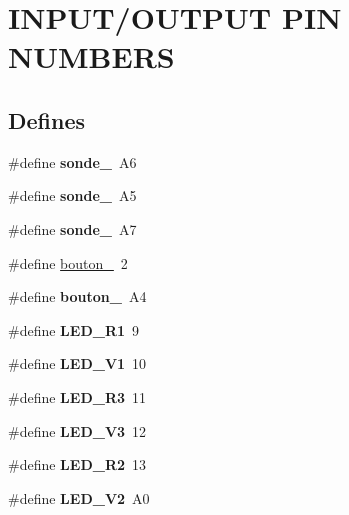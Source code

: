 \hypertarget{group__group2}{
\section{INPUT/OUTPUT PIN NUMBERS}
\label{group__group2}
}
\subsection*{Defines}
\begin{DoxyCompactItemize}
\item 
\hypertarget{group__group2_gac2d01ab1a9474f9807f8ab0c39d6f655}{
\#define {\bfseries sonde\_}~A6}
\label{group__group2_gac2d01ab1a9474f9807f8ab0c39d6f655}

\item 
\hypertarget{group__group2_ga30be1cb09f4c7ea1a84c31cbb105019b}{
\#define {\bfseries sonde\_}~A5}
\label{group__group2_ga30be1cb09f4c7ea1a84c31cbb105019b}

\item 
\hypertarget{group__group2_ga3a6c253bb983ed21757b349061df0577}{
\#define {\bfseries sonde\_}~A7}
\label{group__group2_ga3a6c253bb983ed21757b349061df0577}

\item 
\#define \hyperlink{group__group2_ga8374105c04a302f629cb815b9ecce9d0}{bouton\_}~2
\item 
\hypertarget{group__group2_ga04816731d674fc59c05fabe6ed46490c}{
\#define {\bfseries bouton\_}~A4}
\label{group__group2_ga04816731d674fc59c05fabe6ed46490c}

\item 
\hypertarget{group__group2_ga7c39c163b34af0cf402700ae4c2cda90}{
\#define {\bfseries LED\_\-R1}~9}
\label{group__group2_ga7c39c163b34af0cf402700ae4c2cda90}

\item 
\hypertarget{group__group2_ga49f31f609e8aa450a42d9cd92a737fd3}{
\#define {\bfseries LED\_\-V1}~10}
\label{group__group2_ga49f31f609e8aa450a42d9cd92a737fd3}

\item 
\hypertarget{group__group2_gab6e4806bcd292d6086e900f1e4474cd2}{
\#define {\bfseries LED\_\-R3}~11}
\label{group__group2_gab6e4806bcd292d6086e900f1e4474cd2}

\item 
\hypertarget{group__group2_ga693229446c8c9f9a4f2811fe13f08d7a}{
\#define {\bfseries LED\_\-V3}~12}
\label{group__group2_ga693229446c8c9f9a4f2811fe13f08d7a}

\item 
\hypertarget{group__group2_ga5305b937a67219f3220a0682f1b86fb6}{
\#define {\bfseries LED\_\-R2}~13}
\label{group__group2_ga5305b937a67219f3220a0682f1b86fb6}

\item 
\hypertarget{group__group2_ga9d974e60fbb79f2610bd432ed6e22539}{
\#define {\bfseries LED\_\-V2}~A0}
\label{group__group2_ga9d974e60fbb79f2610bd432ed6e22539}

\end{DoxyCompactItemize}


